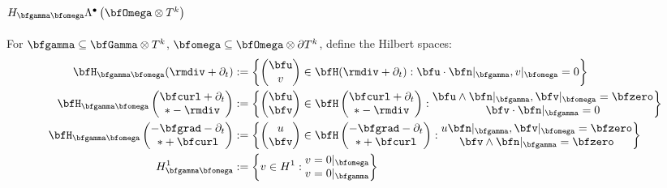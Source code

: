         \subsection*{$H_{\bfgamma\bfomega}\Lambda^{\bullet}\left(\bfOmega\otimes T^{k}\right)$}
            For $\bfgamma  \subseteq  \bfGamma\otimes T^{k}$, $\bfomega  \subseteq  \bfOmega\otimes\partial T^{k}$, define the Hilbert spaces:
            \begin{align}
                \bfH_{\bfgamma\bfomega}(\rmdiv + \partial_{t})  &:=  \left\{\begin{pmatrix} \bfu \\ v \end{pmatrix} \in \bfH(\rmdiv + \partial_{t}) : \bfu\cdot\bfn|_{\bfgamma}, v|_{\bfomega} = 0\right\}  \\
                \bfH_{\bfgamma\bfomega}\left(\begin{matrix} \bfcurl + \partial_{t} \\ * - \rmdiv \end{matrix}\right)  &:=  \left\{\begin{pmatrix} \bfu \\ \bfv \end{pmatrix} \in \bfH\left(\begin{matrix} \bfcurl + \partial_{t} \\ * - \rmdiv \end{matrix}\right) : \begin{matrix} \bfu\wedge\bfn|_{\bfgamma}, \bfv|_{\bfomega} = \bfzero \\ \bfv\cdot\bfn|_{\bfgamma} = 0 \end{matrix}\right\}  \\
                \bfH_{\bfgamma\bfomega}\left(\begin{matrix} - \bfgrad - \partial_{t} \\ * + \bfcurl \end{matrix}\right)  &:=  \left\{\begin{pmatrix} u \\ \bfv \end{pmatrix} \in \bfH\left(\begin{matrix} - \bfgrad - \partial_{t} \\ * + \bfcurl \end{matrix}\right) : \begin{matrix} u\bfn|_{\bfgamma}, \bfv|_{\bfomega} = \bfzero \\ \bfv\wedge\bfn|_{\bfgamma} = \bfzero \end{matrix}\right\}  \\
                H^{1}_{\bfgamma\bfomega}  &:=  \left\{v \in H^{1} : \begin{matrix} v = 0|_{\bfomega} \\ v = 0|_{\bfgamma} \end{matrix}\right\}
            \end{align}
